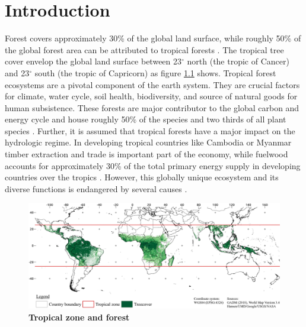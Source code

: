 \chapter{Introduction}
\label{ch:introduction}
	Forest covers approximately 30\% of the global land surface, while roughly 50\% of the global forest area can be attributed to tropical forests \citep{WWF2016}. The tropical tree cover envelop the global land surface between 23$^\circ$ north (the tropic of Cancer) and 23$^\circ$ south (the tropic of Capricorn) as figure \ref{fig:tropicalzone} shows. Tropical forest ecosystems are a pivotal component of the earth system. They are crucial factors for climate, water cycle, soil health, biodiversity, and source of natural goods for human subsistence. These forests are major contributor to the global carbon and energy cycle and house roughly 50\% of the species and two thirds of all plant species \citep{Wright2005,Jordan2005}. Further, it is assumed that tropical forests have a major impact on the hydrologic regime. In developing tropical countries like Cambodia or Myanmar timber extraction and trade is important part of the economy, while fuelwood accounts for approximately 30\% of the total primary energy supply in developing countries over the tropics \citep{Jordan2005}. However, this globally unique ecosystem and its diverse functions is endangered by several causes \citep{WWF2016}.
	\begin{figure}[ht]
		\centering
		\includegraphics[scale=.97]{img/intro_overview_frameless}
		\caption[Tropical zone and forest]{\textbf{Tropical zone and forest}}
		\label{fig:tropicalzone}
	\end{figure}

